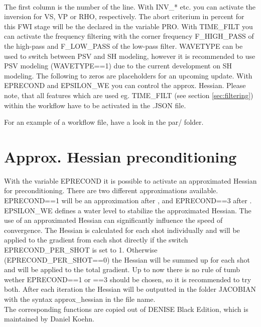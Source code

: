 \ \\
The first column is the number of the line. With INV\_* etc. you can activate the inversion for VS, VP or RHO, respectively. The abort criterium in percent for this FWI stage will be the declared in the variable PRO. With TIME\_FILT you can activate the frequency filtering with the corner frequency F\_HIGH\_PASS of the high-pass and F\_LOW\_PASS of the low-pass filter. WAVETYPE can be used to switch between PSV and SH modeling, however it is recommended to use PSV modeling (WAVETYPE==1) due to the current development on SH modeling. The following to zeros are placeholders for an upcoming update. With EPRECOND and EPSILON\_WE you can control the approx. Hessian. Please note, that all features which are used eg. TIME\_FILT (see section \ref{sec:filtering}) within the workflow have to be activated in the .JSON file.

For an example of a workflow file, have a look in the par/ folder.


\section{Approx. Hessian preconditioning}
{\color{blue}{\begin{verbatim}
			"EPRECOND" : "3",
			"EPSILON_WE" : "0.005",
			
			"EPRECOND_PER_SHOT" : "1",
\end{verbatim}}}
{\color{red}{\begin{verbatim}
Default values are:
			"EPRECOND" : "0",
\end{verbatim}}}

With the variable EPRECOND it is possible to activate an approximated Hessian for preconditioning. There are two different approximations available. EPRECOND==1 will be an approximation after \cite{shin2001efficient}, and EPRECOND==3 after \cite{plessix2004frequency}. EPSILON\_WE defines a water level to stabilize the approximated Hessian. The use of an approximated Hessian can significantly influence the speed of convergence. The Hessian is calculated for each shot individually and will be applied to the gradient from each shot directly if the switch EPRECOND\_PER\_SHOT is set to 1. Otherwise (EPRECOND\_PER\_SHOT==0) the Hessian will be summed up for each shot and will be applied to the total gradient. 
Up to now there is no rule of tumb wether EPRECOND==1 or ==3 should be chosen,  so it is recommended to try both. After each iteration the Hessian will be outputted in the folder JACOBIAN with the syntax \*approx\_hessian\* in the file name.\\
The corresponding functions are copied out of DENISE Black Edition, which is maintained by Daniel Koehn. 

